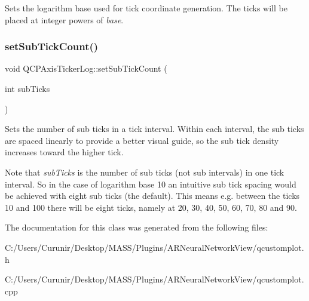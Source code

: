 Sets the logarithm base used for tick coordinate generation. The ticks will be placed at integer powers of {\itshape base}. \mbox{\label{class_q_c_p_axis_ticker_log_ad51989c798c0cfd50936d77aac57c56a}} 
\subsubsection{\texorpdfstring{set\+Sub\+Tick\+Count()}{setSubTickCount()}}
{\footnotesize\ttfamily void Q\+C\+P\+Axis\+Ticker\+Log\+::set\+Sub\+Tick\+Count (\begin{DoxyParamCaption}\item[{int}]{sub\+Ticks }\end{DoxyParamCaption})}

Sets the number of sub ticks in a tick interval. Within each interval, the sub ticks are spaced linearly to provide a better visual guide, so the sub tick density increases toward the higher tick.

Note that {\itshape sub\+Ticks} is the number of sub ticks (not sub intervals) in one tick interval. So in the case of logarithm base 10 an intuitive sub tick spacing would be achieved with eight sub ticks (the default). This means e.\+g. between the ticks 10 and 100 there will be eight ticks, namely at 20, 30, 40, 50, 60, 70, 80 and 90. 

The documentation for this class was generated from the following files\+:\begin{DoxyCompactItemize}
\item 
C\+:/\+Users/\+Curunir/\+Desktop/\+M\+A\+S\+S/\+Plugins/\+A\+R\+Neural\+Network\+View/qcustomplot.\+h\item 
C\+:/\+Users/\+Curunir/\+Desktop/\+M\+A\+S\+S/\+Plugins/\+A\+R\+Neural\+Network\+View/qcustomplot.\+cpp\end{DoxyCompactItemize}
